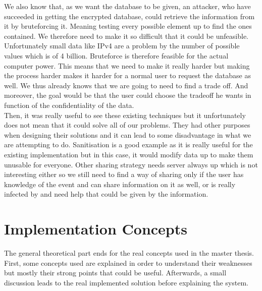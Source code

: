 \documentclass{eplmastersthesis}
\begin{document}
We also know that, as we want the database to be given, an attacker, who have succeeded in getting the encrypted database, could retrieve the information from it by bruteforcing it. Meaning testing every possible element up to find the ones contained. We therefore  need to make it so difficult that it could be unfeasible.
Unfortunately small data like IPv4 are a problem by the number of possible values which is of 4 billion. Bruteforce is therefore feasible for the actual computer power. This means that we need to make it really harder but making the process harder makes it harder for a normal user to request the database as well. We thus already knows that we are going to need to find a trade off. And moreover, the goal would be that the user could choose the tradeoff he wants in function of the  confidentiality of the data.\\

Then, it was really useful to see these existing techniques but it unfortunately does not mean that it could solve all of our problems. They had other purposes when designing their solutions and it can lead to some disadvantage in what we are attempting to do.
Sanitisation is a good example as it is really useful for the existing implementation but in this case, it would modify data up to make them unusable for everyone.
Other sharing strategy needs server always up which is not interesting either so we still need to find a way of sharing only if the user has knowledge of the event and can share information on it as well, or is really infected by and need help that could be given by the information.\\


\chapter{Implementation Concepts}
The general theoretical part ends for the real concepts used in the master thesis. First, some concepts used are explained in order to understand their weaknesses but mostly their strong points that could be useful. Afterwards, a small discussion leads to the real implemented solution before explaining the system.
\end{document}

